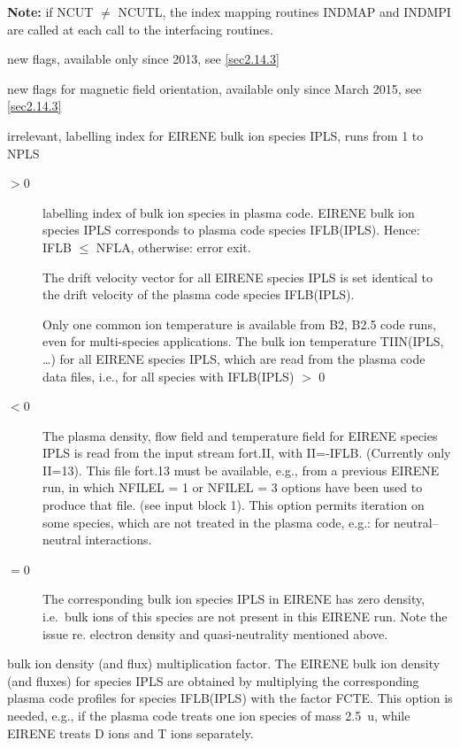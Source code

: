 \begin{description}
        \textbf{Note:} if NCUT $\ne$ NCUTL, the index mapping routines INDMAP and
        INDMPI are called at each call to the interfacing routines.

  \item[MSHFRM, NTRFRM, NFULL] new flags, available only since 2013, see
        \cref{sec2.14.3}
  \item[IBRAD, IBPOL, IBTOR] new flags for magnetic field
        orientation, available only since March 2015, see \cref{sec2.14.3}
  \item[I]
        irrelevant, labelling index for EIRENE bulk ion species IPLS, runs from 1 to
        NPLS
  \item[IFLB]
        \begin{description}
          \item[$> 0$] labelling index of bulk ion
                species in plasma code.
                EIRENE bulk ion species IPLS corresponds to plasma code species IFLB(IPLS).
                Hence:
                IFLB $\le$ NFLA, otherwise: error exit.

                The drift velocity vector for all EIRENE species IPLS is set identical to the
                drift velocity of the plasma code species IFLB(IPLS).

                Only one common ion temperature is available from B2, B2.5 code runs, even for
                multi-species applications.
                The bulk ion temperature TIIN(IPLS, \dots) for all EIRENE species IPLS, which
                are read from the plasma code data files, i.e., for all species with IFLB(IPLS)
                $>$ 0
          \item[$< 0$] The plasma density, flow field and temperature field for
                EIRENE species IPLS is read from the input stream fort.II, with II=-IFLB.
                (Currently only II=13).
                This file fort.13 must be available, e.g., from a previous EIRENE run, in which
                NFILEL = 1 or NFILEL = 3 options have been used to produce that file.
                (see input block 1).
                This option permits iteration on some species, which are not treated in the
                plasma code, e.g.: for neutral--neutral interactions.
          \item[$= 0$] The corresponding bulk ion species IPLS in EIRENE has zero
                density, i.e.\ bulk ions of this species are not present in this EIRENE run.
                Note the issue re.
                electron density and quasi-neutrality mentioned
                above.
        \end{description}
  \item[FCTE] bulk ion density (and flux) multiplication factor.
        The EIRENE bulk ion density (and fluxes) for species IPLS are obtained by
        multiplying the corresponding plasma code profiles for species IFLB(IPLS) with
        the factor FCTE.
        This option is needed, e.g., if the plasma code treats one ion species of mass
        \SI{2.5}{\atomicmassunit}, while EIRENE treats D ions and T ions separately.


\end{description}
